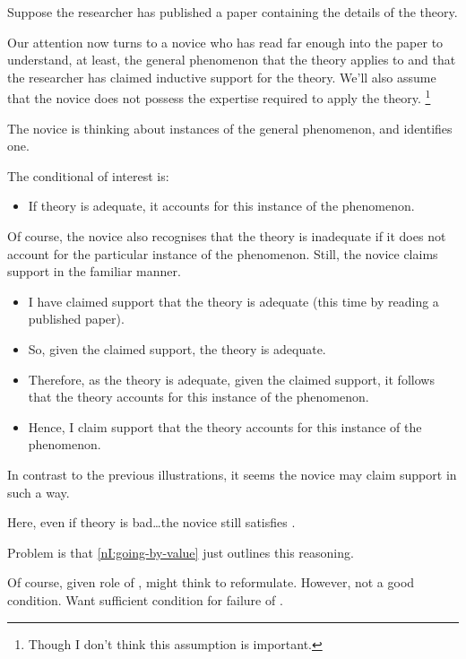 \begin{note}
  \begin{illustration}\label{ill:CE:testimony}
    Suppose the researcher has published a paper containing the details of the theory.

    Our attention now turns to a novice who has read far enough into the paper to understand, at least, the general phenomenon that the theory applies to and that the researcher has claimed inductive support for the theory.
    We'll also assume that the novice does not possess the expertise required to apply the theory.\nolinebreak
    \footnote{
      Though I don't think this assumption is important.
    }

    The novice is thinking about instances of the general phenomenon, and identifies one.

    The conditional of interest is:
    \begin{itemize}
    \item If theory is adequate, it accounts for this instance of the phenomenon.
    \end{itemize}

    Of course, the novice also recognises that the theory is inadequate if it  does not account for the particular instance of the phenomenon.
    Still, the novice claims support in the familiar manner.

    \begin{itemize}
    \item I have claimed support that the theory is adequate (this time by reading a published paper).
    \item So, given the claimed support, the theory is adequate.
    \item Therefore, as the theory is adequate, given the claimed support, it follows that the theory accounts for this instance of the phenomenon.
    \item Hence, I claim support that the theory accounts for this instance of the phenomenon.
    \end{itemize}
    In contrast to the previous illustrations, it seems the novice may claim support in such a way.
  \end{illustration}

  Here, even if theory is bad\dots the novice still satisfies \eiS{}.

  Problem is that \ref{nI:going-by-value} just outlines this reasoning.

  Of course, given role of \eiS{}, might think to reformulate.
  However, not a good condition.
  Want sufficient condition for failure of \eiS{}.
\end{note}

